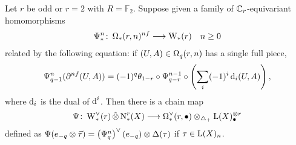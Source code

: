 \begin{proposition} \label{prop:omegarm}
	Let $r$ be odd or $r=2$ with $R=\mathbb{F}_2$. Suppose given a family of $\Cyc_r$-equivariant homomorphisms
	\begin{align*}
		\Psiom_*^n\colon \Om(r,n)^{\nf}&\lra \rW(r) & n\geq 0
	\end{align*}
	related by the following equation: if $(U,A)\in \Om[q](r,n)$ has a single full piece,
	\begin{equation}
		 \label{it:1a}
		\Psiom^n_{q-1}(\partial^{\nf} (U,A)) = (-1)^q\theta_{1-r}\circ \Psiom^{n-1}_{q-r}\circ \left(\sum_i (-1)^i \d_i(U,A)\right),
	\end{equation}
	where $\d_i$ is the dual of $\d^i$. Then there is a chain map
	\[
	\Psi\colon \rWd(r)\hotimes \rchains(X)\lra \Omd(r,\bullet)\otimes_{\asimplex} \rA(X)_\bullet^{\otimes r}
	\]
	defined as $\Psi(e_{-q}\otimes \vec{\tau}) = \left(\Psiom^n_q\right)^\vee(e_{-q})\otimes \Delta(\tau)$ if $\tau\in \rA(X)_{n}$.
\end{proposition}
\def\diaglin{\Delta}


